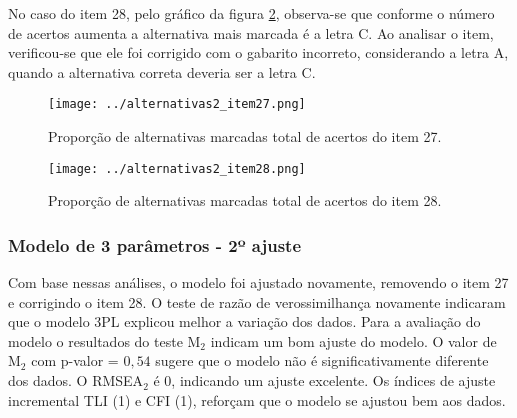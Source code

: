 	
No caso do item 28, pelo gráfico da figura \ref{fig:item_28}, observa-se que conforme o número de acertos aumenta a alternativa mais marcada é a letra C. Ao analisar o item, verificou-se que ele foi corrigido com o gabarito incorreto, considerando a letra A, quando a alternativa correta deveria ser a letra C. 

\begin{figure}[H]
	\centering
	\caption{Proporção de alternativas marcadas total de acertos do item 27.}
	\texttt{[image: ../alternativas2\_item27.png]}
	\parbox{\textwidth}{
		\centering %
	}
	\label{fig:item_27}
\end{figure}


\begin{figure}[H]
	\centering
	\caption{Proporção de alternativas marcadas total de acertos do item 28.}
	\texttt{[image: ../alternativas2\_item28.png]}
	\parbox{\textwidth}{
	\centering %
}	
	\label{fig:item_28}
\end{figure}




\subsubsection{Modelo de 3 parâmetros - 2º ajuste}

 Com base nessas análises, o modelo foi ajustado novamente, removendo o item 27 e corrigindo o item 28. O teste de razão de verossimilhança novamente indicaram que o modelo 3PL explicou melhor a variação dos dados. Para a avaliação do modelo o resultados do teste M$_2$ indicam um bom ajuste do modelo. O valor de M$_2$ com p-valor = $0,54$ sugere que o modelo não é significativamente diferente dos dados. O RMSEA$_2$ é 0, indicando um ajuste excelente. Os índices de ajuste incremental TLI (1) e CFI (1), reforçam que o modelo se ajustou bem aos dados.
 

